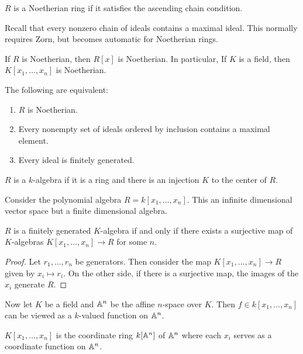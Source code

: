 \documentclass[10pt, twoside]{article}
\begin{document}
        \begin{defn} $R$ is a Noetherian ring if it satisfies
        the ascending chain condition.  \end{defn}

        Recall that every nonzero chain of ideals contains a maximal ideal.
        This normally requires Zorn, but becomes automatic for Noetherian
        rings.

        \begin{exm} If $R$ is Noetherian, then $R[x]$ is Noetherian.  In
        particular, If $K$ is a field, then $K[x_1, \ldots, x_n]$ is
    Noetherian.  \end{exm}

        \begin{thm} The following are equivalent: \begin{enumerate} \item $R$
        is Noetherian.  \item Every nonempty set of ideals ordered by inclusion
contains a maximal element.  \item Every ideal is finitely generated.
\end{enumerate} \end{thm}

        \begin{defn}[$k$-algebra] $R$ is a $k$-algebra if it is a ring and
        there is an injection $K$ to the center of $R$.  \end{defn}

        \begin{exm} Consider the polynomial algebra $R = k[x_1, \ldots, x_n]$.
        This an infinite dimensional vector space but a finite dimensional
    algebra.  \end{exm}

        \begin{prop} $R$ is a finitely generated $K$-algebra if and only if
            there exists a surjective map of $K$-algebras $K[x_1, \ldots, x_n]
            \to R$ for some $n$.  \begin{proof} Let $r_1, \ldots, r_n$ be
                generators. Then consider the map $K[x_1, \ldots, x_n] \to R$
                given by $x_i \mapsto r_i$. On the other side, if there is a
                surjective map, the images of the $x_i$ generate $R$.
            \end{proof} \end{prop}

        Now let $K$ be a field and $\mathbb{A}^n$ be the affine $n$-space over $K$.
        Then $f \in k[x_1, \ldots, x_n]$ can be viewed as a $k$-valued function
        on $\mathbb{A}^n$.  \begin{defn} $K[x_1, \ldots, x_n]$ is the coordinate ring
            $k[\mathbb{A}^n]$ of $\mathbb{A}^n$ where each $x_i$ serves as a coordinate
            function on $\mathbb{A}^n$.  \end{defn}
\end{document}
